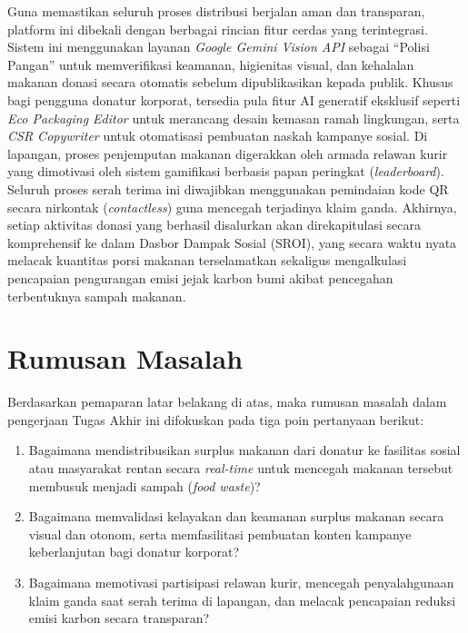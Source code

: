 Guna memastikan seluruh proses distribusi berjalan aman dan transparan, platform ini dibekali dengan berbagai rincian fitur cerdas yang terintegrasi. Sistem ini menggunakan layanan \textit{Google Gemini Vision API} sebagai ``Polisi Pangan'' untuk memverifikasi keamanan, higienitas visual, dan kehalalan makanan donasi secara otomatis sebelum dipublikasikan kepada publik. Khusus bagi pengguna donatur korporat, tersedia pula fitur AI generatif eksklusif seperti \textit{Eco Packaging Editor} untuk merancang desain kemasan ramah lingkungan, serta \textit{CSR Copywriter} untuk otomatisasi pembuatan naskah kampanye sosial. Di lapangan, proses penjemputan makanan digerakkan oleh armada relawan kurir yang dimotivasi oleh sistem gamifikasi berbasis papan peringkat (\textit{leaderboard}). Seluruh proses serah terima ini diwajibkan menggunakan pemindaian kode QR secara nirkontak (\textit{contactless}) guna mencegah terjadinya klaim ganda. Akhirnya, setiap aktivitas donasi yang berhasil disalurkan akan direkapitulasi secara komprehensif ke dalam Dasbor Dampak Sosial (SROI), yang secara waktu nyata melacak kuantitas porsi makanan terselamatkan sekaligus mengalkulasi pencapaian pengurangan emisi jejak karbon bumi akibat pencegahan terbentuknya sampah makanan.


\section{Rumusan Masalah}
Berdasarkan pemaparan latar belakang di atas, maka rumusan masalah dalam pengerjaan Tugas Akhir ini difokuskan pada tiga poin pertanyaan berikut:
\begin{enumerate}
\item Bagaimana mendistribusikan surplus makanan dari donatur ke fasilitas sosial atau masyarakat rentan secara \textit{real-time} untuk mencegah makanan tersebut membusuk menjadi sampah (\textit{food waste})?
\item Bagaimana memvalidasi kelayakan dan keamanan surplus makanan secara visual dan otonom, serta memfasilitasi pembuatan konten kampanye keberlanjutan bagi donatur korporat?
\item Bagaimana memotivasi partisipasi relawan kurir, mencegah penyalahgunaan klaim ganda saat serah terima di lapangan, dan melacak pencapaian reduksi emisi karbon secara transparan?
\end{enumerate}

